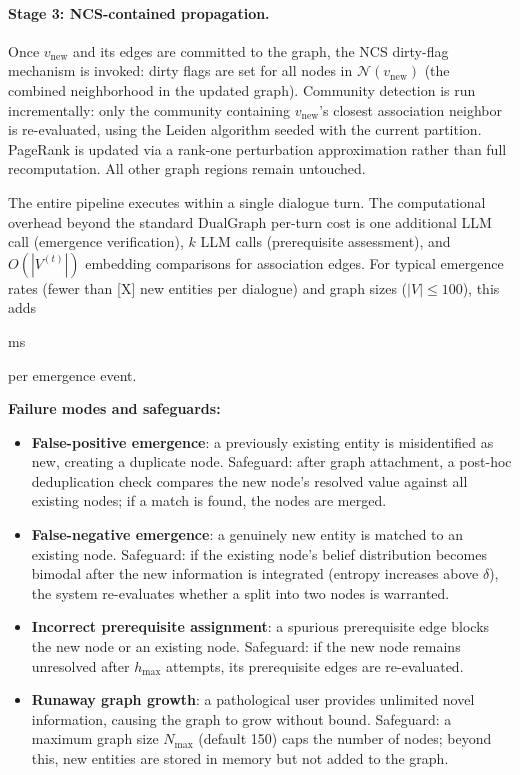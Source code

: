 \documentclass[11pt,a4paper]{article}
\newcommand{\placeholder}[1]{%
  \begin{tcolorbox}[colback=yellow!10,colframe=orange!60!black,
    fonttitle=\bfseries,title=Placeholder]
    #1
  \end{tcolorbox}%
}
\begin{document}
\paragraph{Stage 3: NCS-contained propagation.}
Once $v_{\mathrm{new}}$ and its edges are committed to the graph, the
NCS dirty-flag mechanism is invoked: dirty flags are set for all nodes in
$\mathcal{N}(v_{\mathrm{new}})$ (the combined neighborhood in the updated
graph). Community detection is run incrementally: only the community
containing $v_{\mathrm{new}}$'s closest association neighbor is
re-evaluated, using the Leiden algorithm seeded with the current partition.
PageRank is updated via a rank-one perturbation approximation rather than
full recomputation. All other graph regions remain untouched.

The entire pipeline executes within a single dialogue turn. The
computational overhead beyond the standard DualGraph per-turn cost is one
additional LLM call (emergence verification), $k$ LLM calls (prerequisite
assessment), and $O(|V^{(t)}|)$ embedding comparisons for association
edges. For typical emergence rates (fewer than [X] new entities per
dialogue) and graph sizes ($|V| \leq 100$), this adds \placeholder{[Y] ms}
per emergence event.

\placeholder{%
  \textbf{Failure modes and safeguards:}
  \begin{itemize}[noitemsep]
    \item \textbf{False-positive emergence}: a previously existing entity
          is misidentified as new, creating a duplicate node. Safeguard:
          after graph attachment, a post-hoc deduplication check compares
          the new node's resolved value against all existing nodes; if a
          match is found, the nodes are merged.
    \item \textbf{False-negative emergence}: a genuinely new entity is
          matched to an existing node. Safeguard: if the existing node's
          belief distribution becomes bimodal after the new information
          is integrated (entropy increases above $\delta$), the system
          re-evaluates whether a split into two nodes is warranted.
    \item \textbf{Incorrect prerequisite assignment}: a spurious
          prerequisite edge blocks the new node or an existing node.
          Safeguard: if the new node remains unresolved after $h_{\max}$
          attempts, its prerequisite edges are re-evaluated.
    \item \textbf{Runaway graph growth}: a pathological user provides
          unlimited novel information, causing the graph to grow without
          bound. Safeguard: a maximum graph size $N_{\max}$ (default 150)
          caps the number of nodes; beyond this, new entities are stored
          in memory but not added to the graph.
  \end{itemize}
}
\end{document}
